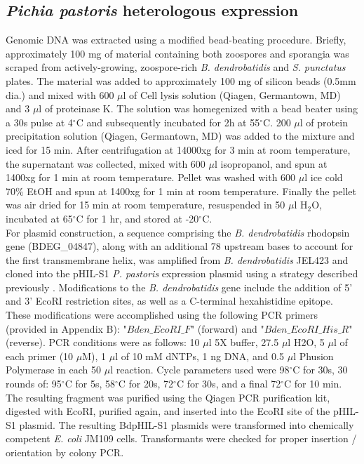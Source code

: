 \subsection*{\textit{Pichia pastoris} heterologous expression}
Genomic DNA was extracted using a modified bead-beating procedure. Briefly, approximately 100 mg of material containing both zoospores and sporangia was scraped from actively-growing, zoospore-rich \textit{B. dendrobatidis} and \textit{S. punctatus} plates. The material was added to approximately 100 mg of silicon beads (0.5mm dia.) and mixed with 600 $\mu$l of Cell lysis solution (Qiagen, Germantown, MD) and 3 $\mu$l of proteinase K. The solution was homegenized with a bead beater using a 30s pulse at 4$^{\circ}$C and subsequently incubated for 2h at 55$^{\circ}$C. 200 $\mu$l of protein precipitation solution (Qiagen, Germantown, MD) was added to the mixture and iced for 15 min. After centrifugation at 14000xg for 3 min at room temperature, the supernatant was collected, mixed with 600 $\mu$l isopropanol, and spun at 1400xg for 1 min at room temperature. Pellet was washed with 600 $\mu$l ice cold 70\% EtOH and spun at 1400xg for 1 min at room temperature. Finally the pellet was air dried for 15 min at room temperature, resuspended in 50 $\mu$l H$_{2}$O, incubated at 65$^{\circ}$C for 1 hr, and stored at -20$^{\circ}$C.\\
\indent For plasmid construction, a sequence comprising the \textit{B. dendrobatidis} rhodopsin gene (BDEG\_04847), along with an additional 78 upstream bases to account for the first transmembrane helix, was amplified from \textit{B. dendrobatidis} JEL423 and cloned into the pHIL-S1 \textit{P. pastoris} expression plasmid using a strategy described previously \cite{Bieszke1999}.  Modifications to the \textit{B. dendrobatidis} gene include the addition of 5' and 3' EcoRI restriction sites, as well as a C-terminal hexahistidine epitope. These modifications were accomplished using the following PCR primers (provided in Appendix B): "$Bden\_EcoRI\_F$" (forward) and "$Bden\_EcoRI\_His\_R$" (reverse). PCR conditions were as follows: 10 $\mu$l 5X buffer, 27.5 $\mu$l H2O, 5 $\mu$l of each primer (10 $\mu$M), 1 $\mu$l of 10 mM dNTPs, 1 ng DNA, and 0.5 $\mu$l Phusion Polymerase in each 50 $\mu$l reaction. Cycle parameters used were 98$^{\circ}$C for 30s, 30 rounds of: 95$^{\circ}$C for 5s, 58$^{\circ}$C for 20s, 72$^{\circ}$C for 30s, and a final 72$^{\circ}$C for 10 min. The resulting fragment was purified using the Qiagen PCR purification kit, digested with EcoRI, purified again, and inserted into the EcoRI site of the pHIL-S1 plasmid. The resulting BdpHIL-S1 plasmids were transformed into chemically competent \textit{E. coli} JM109 cells. Transformants were checked for proper insertion / orientation by colony PCR.\\ 
